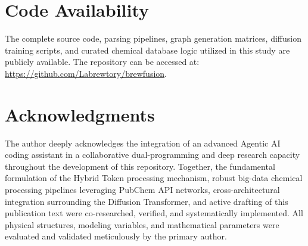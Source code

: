 \documentclass[10pt,twocolumn,letterpaper]{article}
\begin{document}
\section{Code Availability}
The complete source code, parsing pipelines, graph generation matrices, diffusion training scripts, and curated chemical database logic utilized in this study are publicly available. The repository can be accessed at: \url{https://github.com/Labrewtory/brewfusion}.

\section{Acknowledgments}
The author deeply acknowledges the integration of an advanced Agentic AI coding assistant in a collaborative dual-programming and deep research capacity throughout the development of this repository. Together, the fundamental formulation of the Hybrid Token processing mechanism, robust big-data chemical processing pipelines leveraging PubChem API networks, cross-architectural integration surrounding the Diffusion Transformer, and active drafting of this publication text were co-researched, verified, and systematically implemented. All physical structures, modeling variables, and mathematical parameters were evaluated and validated meticulously by the primary author.
\end{document}
